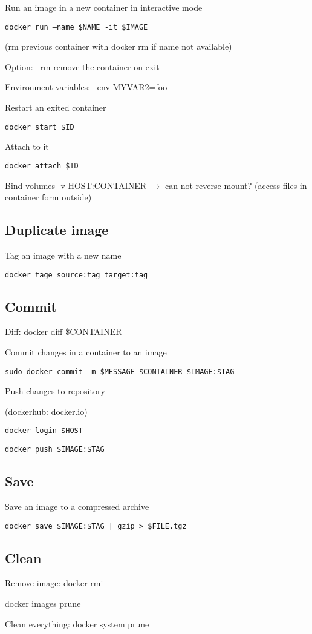 Run an image in a new container in interactive mode

\texttt{docker run --name \$NAME -it \$IMAGE}

(rm previous container with docker rm if name not available)

Option: --rm remove the container on exit

Environment variables: --env MYVAR2=foo

Restart an exited container

\texttt{docker start \$ID}

Attach to it

\texttt{docker attach \$ID}

Bind volumes -v HOST:CONTAINER
$\rightarrow$ can not reverse mount? (access files in container form outside)


\subsection*{Duplicate image}


Tag an image with a new name

\texttt{docker tage source:tag target:tag}

\subsection*{Commit}

Diff: docker diff \$CONTAINER

Commit changes in a container to an image

\texttt{sudo docker commit -m \$MESSAGE \$CONTAINER \$IMAGE:\$TAG}

\bigskip

Push changes to repository

(dockerhub: docker.io)

\texttt{docker login \$HOST}

\texttt{docker push \$IMAGE:\$TAG}



\subsection*{Save}


Save an image to a compressed archive

\texttt{docker save \$IMAGE:\$TAG | gzip > \$FILE.tgz }

\subsection*{Clean}

Remove image: docker rmi

docker images prune

Clean everything: docker system prune




%
%



